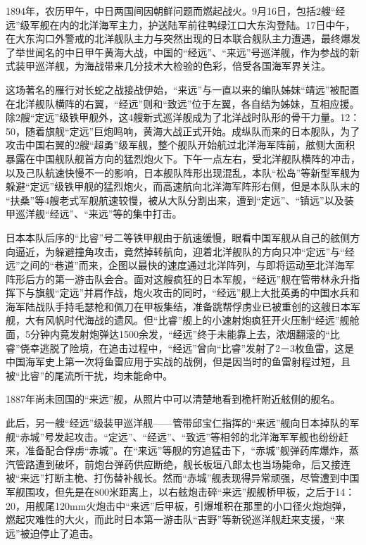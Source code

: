 \documentclass[12pt,UTF8]{ctexbook}
\begin{document}
1894年，农历甲午，中日两国间因朝鲜问题而燃起战火。9月16日，包括2艘“经远”级军舰在内的北洋海军主力，护送陆军前往鸭绿江口大东沟登陆。17日中午，在大东沟口外警戒的北洋舰队主力与突然出现的日本联合舰队主力遭遇，最终爆发了举世闻名的中日甲午黄海大战，中国的“经远”、“来远”号巡洋舰，作为参战的新式装甲巡洋舰，为海战带来几分技术大检验的色彩，倍受各国海军界关注。

这场著名的雁行对长蛇之战接战伊始，“来远”与一直以来的编队姊妹“靖远”被配置在北洋舰队横阵的右翼，“经远”则和“致远”位于左翼，各自结为姊妹，互相应援。除2艘“定远”级铁甲舰外，这4艘新式巡洋舰成为了北洋战时队形的骨干力量。12：50，随着旗舰“定远”巨炮鸣响，黄海大战正式开始。成纵队而来的日本舰队，为了攻击中国右翼的2艘“超勇”级军舰，整个舰队开始航过北洋海军阵前，舷侧大面积暴露在中国舰队舰首方向的猛烈炮火下。下午一点左右，受北洋舰队横阵的冲击，以及己队航速快慢不一的影响，日本舰队阵形出现混乱，本队“松岛”等新型军舰为躲避“定远”级铁甲舰的猛烈炮火，而高速航向北洋海军阵形右侧，但是本队队末的 “扶桑”等4艘老式军舰航速较慢，被从大队分割出来，遭到“定远”、“镇远”以及装甲巡洋舰“经远”、“来远”等的集中打击。

日本本队后序的“比睿”号二等铁甲舰由于航速缓慢，眼看中国军舰从自己的舷侧方向逼近，为躲避撞角攻击，竟然掉转航向，迎着北洋舰队的方向只冲“定远”与“经远”之间的“巷道”而来，企图以最快的速度通过北洋阵列，与即将运动至北洋海军阵形后方的第一游击队会合。面对这艘疯狂的日本军舰，“经远”舰在管带林永升指挥下与旗舰“定远”并肩作战，炮火攻击的同时，“经远”舰上大批英勇的中国水兵和海军陆战队手持毛瑟枪和佩刀在甲板集结，准备跳帮俘虏业已被重创的这艘日本军舰，大有风帆时代海战的遗风。但“比睿”舰上的小速射炮疯狂开火压制“经远”舰舱面，5分钟内竟发射炮弹达1500余发，“经远”终于未能靠上去，浓烟翻滚的“比睿”侥幸逃脱了险境，在追击过程中，“经远”曾向“比睿”发射了2－3枚鱼雷，这是中国海军史上第一次将鱼雷应用于实战的战例，但是因当时的鱼雷射程过短，且被“比睿”的尾流所干扰，均未能命中。

1887年尚未回国的“来远”舰，从照片中可以清楚地看到桅杆附近舷侧的舰名。

此后，另一艘“经远”级装甲巡洋舰——管带邱宝仁指挥的“来远”舰向日本掉队的军舰“赤城”号发起攻击。“定远”、“经远”、“致远”等相邻的北洋海军军舰也纷纷赶来，准备配合俘虏“赤城”。在“来远”等舰的穷追猛击下，“赤城”舰弹药库爆炸，蒸汽管路遭到破坏，前炮台弹药供应断绝，舰长板垣八郎太也当场毙命，后又接连被“来远”打断主桅、打伤替补舰长。然而“赤城”舰表现得异常顽强，尽管遭到中国军舰围攻，但先是在800米距离上，以右舷炮击碎“来远”舰舰桥甲板，之后于14：20，用舰尾120mm火炮击中“来远”后甲板，引爆堆积在那里的小口径火炮炮弹，燃起灾难性的大火，而此时日本第一游击队“吉野”等新锐巡洋舰赶来支援，“来远”被迫停止了追击。
\end{document}
